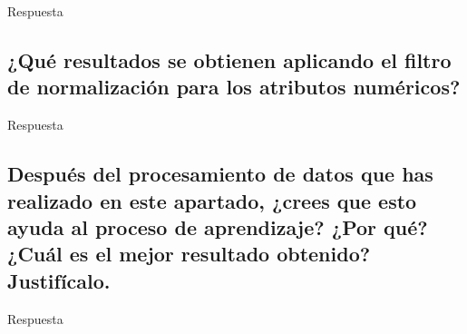 \documentclass[12pt]{article}
\begin{document}
Respuesta

\subsection*{\small ¿Qué resultados se obtienen aplicando el filtro de
normalización para los atributos numéricos?}

Respuesta

\subsection*{\small Después del procesamiento de datos que has realizado en este
apartado, ¿crees que esto ayuda al proceso de aprendizaje? ¿Por qué? ¿Cuál es
el mejor resultado obtenido? Justifícalo.}

Respuesta
\end{document}
